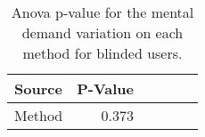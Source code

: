 
\begin{table}[!htb]
\centering
\caption{Anova p-value for the mental demand variation on each method for blinded users.}
\label{tab:blocanova_mental_demand_var}
\begin{tabular}{lrrrrr}
\toprule
Source & P-Value \\
\midrule
Method &   0.373 \\
\bottomrule
\end{tabular}
\end{table}

